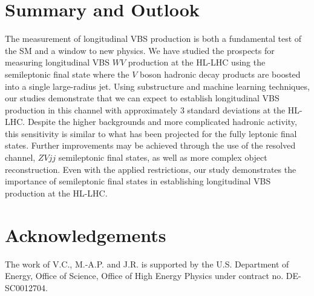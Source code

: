 \documentclass[amsmath,amssymb,aps,prd,preprint,groupedaddress]{revtex4-2}
\begin{document}
\section{Summary and Outlook}
\label{sec:summary}
The measurement of longitudinal VBS production is both a fundamental test of the SM and a window to new physics.
We have studied the prospects for measuring longitudinal VBS $WV$ production at the HL-LHC using the semileptonic final state 
where the $V$ boson hadronic decay products are boosted into a single large-radius jet.
Using substructure and machine learning techniques, our studies demonstrate that we can expect to establish longitudinal VBS production in this channel with approximately 3 standard deviations at the HL-LHC.
Despite the higher backgrounds and more complicated hadronic activity, this sensitivity is similar to what has been projected for the fully leptonic final states.
Further improvements may be achieved through the use of the resolved channel, $ZV jj$ semileptonic final states, as well as more complex object reconstruction. Even with the applied restrictions, our study demonstrates the importance of semileptonic final states in establishing longitudinal VBS production at the HL-LHC.

\section{Acknowledgements}
The work of V.C., M.-A.P. and J.R. is supported by the U.S. Department of Energy, Office of Science, Office of High Energy Physics under contract no. DE-SC0012704. 



 


\clearpage


\end{document}

